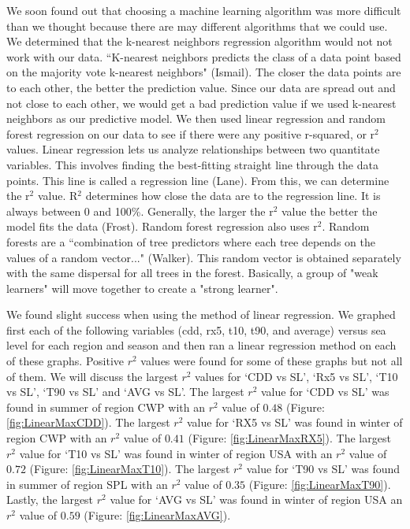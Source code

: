 \documentclass[12pt]{report}
\begin{document}
\indent	\par We soon found out that choosing a machine learning algorithm was more difficult than we thought because there are may different algorithms that we could use. We determined that the k-nearest neighbors regression algorithm would not not work with our data. \textquotedblleft K-nearest neighbors predicts the class of a data point based on the majority vote k-nearest neighbors" (Ismail). The closer the data points are to each other, the better the prediction value. Since our data are spread out and not close to each other, we would get a bad prediction value if we used k-nearest neighbors as our predictive model. We then used linear regression and random forest regression on our data to see if there were any positive r-squared, or r$^2$ values. Linear regression lets us analyze relationships between two quantitate variables. This involves finding the best-fitting straight line through the data points. This line is called a regression line (Lane). From this, we can determine the r$^2$ value. R$^2$ determines how close the data are to the regression line. It is always between 0 and 100\%.  Generally, the larger the r$^2$ value the better the model fits the data (Frost). Random forest regression also uses r$^2$. Random forests are a  \textquotedblleft combination of tree predictors where each tree depends on the values of a random vector..." (Walker). This random vector is obtained separately with the same dispersal for all trees in the forest. Basically, a group of "weak learners" will move together to create a "strong learner".
	\par We found slight success when using the method of linear regression. We graphed first each of the following variables (cdd, rx5, t10, t90, and average) versus sea level for each region and season and then ran a linear regression method on each of these graphs. Positive $r^2$ values were found for some of these graphs but not all of them. We will discuss the largest $r^2$ values for \textquoteleft CDD vs SL', \textquoteleft Rx5 vs SL', \textquoteleft T10 vs SL', \textquoteleft T90 vs SL' and \textquoteleft AVG vs SL'. The largest $r^2$ value for \textquoteleft CDD vs SL' was found in summer of region CWP with an $r^2$ value of $0.48$ (Figure: \ref{fig:LinearMaxCDD}). The largest $r^2$ value for \textquoteleft RX5 vs SL' was found in winter of region CWP with an $r^2$ value of $0.41$ (Figure: \ref{fig:LinearMaxRX5}). The largest $r^2$ value for \textquoteleft T10 vs SL' was found in winter of region USA with an $r^2$ value of $0.72$ (Figure: \ref{fig:LinearMaxT10}). The largest $r^2$ value for \textquoteleft T90 vs SL' was found in summer of region SPL with an $r^2$ value of $0.35$ (Figure: \ref{fig:LinearMaxT90}). Lastly, the largest $r^2$ value for \textquoteleft AVG vs SL' was found in winter of region USA an $r^2$ value of $0.59$ (Figure: \ref{fig:LinearMaxAVG}).
	
\end{document}
